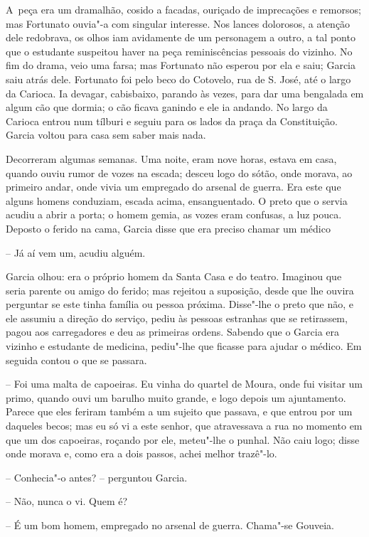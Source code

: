 A~peça era um dramalhão, cosido a facadas, ouriçado de imprecações e
remorsos; mas Fortunato ouvia"-a com singular interesse. Nos lances
dolorosos, a atenção dele redobrava, os olhos iam avidamente de um
personagem a outro, a tal ponto que o estudante suspeitou haver na peça
reminiscências pessoais do vizinho. No fim do drama, veio uma farsa; mas
Fortunato não esperou por ela e saiu; Garcia saiu atrás dele. Fortunato
foi pelo beco do Cotovelo, rua de S. José, até o largo da Carioca. Ia
devagar, cabisbaixo, parando às vezes, para dar uma bengalada em algum
cão que dormia; o cão ficava ganindo e ele ia andando. No largo da
Carioca entrou num tílburi e seguiu para os lados da praça da
Constituição. Garcia voltou para casa sem saber mais nada.

Decorreram algumas semanas. Uma noite, eram nove horas, estava em casa,
quando ouviu rumor de vozes na escada; desceu logo do sótão, onde
morava, ao primeiro andar, onde vivia um empregado do arsenal de guerra.
Era este que alguns homens conduziam, escada acima, ensanguentado. O
preto que o servia acudiu a abrir a porta; o homem gemia, as vozes eram
confusas, a luz pouca. Deposto o ferido na cama, Garcia disse que era
preciso chamar um médico

-- Já aí vem um, acudiu alguém.

Garcia olhou: era o próprio homem da Santa Casa e do teatro. Imaginou
que seria parente ou amigo do ferido; mas rejeitou a suposição, desde
que lhe ouvira perguntar se este tinha família ou pessoa próxima.
Disse"-lhe o preto que não, e ele assumiu a direção do serviço, pediu às
pessoas estranhas que se retirassem, pagou aos carregadores e deu as
primeiras ordens. Sabendo que o Garcia era vizinho e estudante de
medicina, pediu"-lhe que ficasse para ajudar o médico. Em seguida contou
o que se passara.

-- Foi uma malta de capoeiras. Eu vinha do quartel de Moura, onde fui
visitar um primo, quando ouvi um barulho muito grande, e logo depois um
ajuntamento. Parece que eles feriram também a um sujeito que passava, e
que entrou por um daqueles becos; mas eu só vi a este senhor, que
atravessava a rua no momento em que um dos capoeiras, roçando por ele,
meteu"-lhe o punhal. Não caiu logo; disse onde morava e, como era a dois
passos, achei melhor trazê"-lo.

-- Conhecia"-o antes? -- perguntou Garcia.

-- Não, nunca o vi. Quem é?

-- É um bom homem, empregado no arsenal de guerra. Chama"-se Gouveia.

